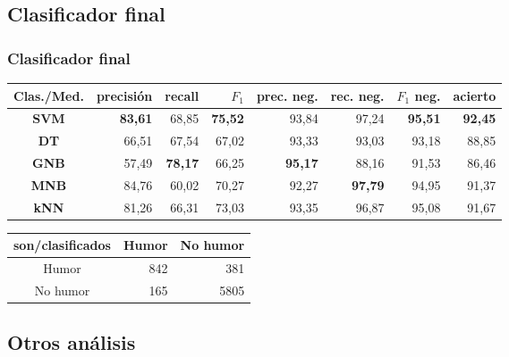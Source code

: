 \subsection{Clasificador final}
\begin{frame}
    \frametitle{Clasificador final}

    \begin{center}
        \scriptsize

        \begin{tabular}{ c | r | r | r | r | r | r | r }
            \textbf{Clas./Med.} & precisión & recall & $F_1$ & prec. neg. & rec. neg. & $F_1$ neg. & acierto \\
            \hline
            \textbf{SVM} & \textbf{83,61} & 68,85 & \textbf{75,52} & 93,84 & 97,24 & \textbf{95,51} & \textbf{92,45} \\
            \hline
            \textbf{DT} & 66,51 & 67,54 & 67,02 & 93,33 & 93,03 & 93,18 & 88,85 \\
            \hline
            \textbf{GNB} & 57,49 & \textbf{78,17} & 66,25 & \textbf{95,17} & 88,16 & 91,53 & 86,46 \\
            \hline
            \textbf{MNB} & 84,76 & 60,02 & 70,27 & 92,27 & \textbf{97,79} & 94,95 & 91,37 \\
            \hline
            \textbf{kNN} & 81,26 & 66,31 & 73,03 & 93,35 & 96,87 & 95,08 & 91,67 \\
        \end{tabular}

        \vfill

        \begin{tabular}{ c | r | r }
            \textbf{son/clasificados} & Humor & No humor \\
            \hline
            Humor & 842 & 381 \\
            \hline
            No humor & 165 & 5805 \\
        \end{tabular}
    \end{center}
\end{frame}

\subsection{Otros análisis}

